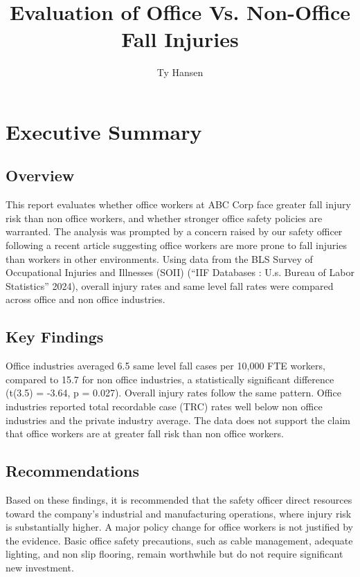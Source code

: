 \documentclass[
  letterpaper,
  DIV=11,
  numbers=noendperiod]{scrreprt}
\title{Evaluation of Office Vs. Non-Office Fall Injuries}
\author{Ty Hansen}
\date{}
\renewcommand*\contentsname{Table of contents}
\newcommand\contentsname{Table of contents}
\begin{document}
\maketitle

\renewcommand*\contentsname{Table of contents}
{
\hypersetup{linkcolor=}
\setcounter{tocdepth}{2}
\tableofcontents
}


\chapter{Executive Summary}\label{executive-summary}

\section{Overview}\label{overview}

This report evaluates whether office workers at ABC Corp face greater
fall injury risk than non office workers, and whether stronger office
safety policies are warranted. The analysis was prompted by a concern
raised by our safety officer following a recent article suggesting
office workers are more prone to fall injuries than workers in other
environments. Using data from the BLS Survey of Occupational Injuries
and Illnesses (SOII) ({``{IIF} Databases : U.s. Bureau of Labor
Statistics''} 2024), overall injury rates and same level fall rates were
compared across office and non office industries.

\section{Key Findings}\label{key-findings}

Office industries averaged 6.5 same level fall cases per 10,000 FTE
workers, compared to 15.7 for non office industries, a statistically
significant difference (t(3.5) = -3.64, p = 0.027). Overall injury rates
follow the same pattern. Office industries reported total recordable
case (TRC) rates well below non office industries and the private
industry average. The data does not support the claim that office
workers are at greater fall risk than non office workers.

\section{Recommendations}\label{recommendations}

Based on these findings, it is recommended that the safety officer
direct resources toward the company's industrial and manufacturing
operations, where injury risk is substantially higher. A major policy
change for office workers is not justified by the evidence. Basic office
safety precautions, such as cable management, adequate lighting, and non
slip flooring, remain worthwhile but do not require significant new
investment.
\end{document}
